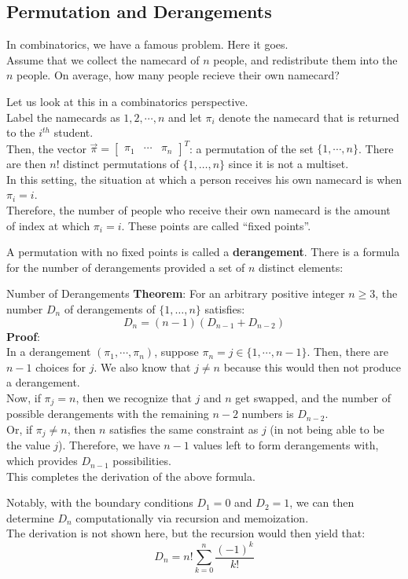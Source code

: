 \subsection{Permutation and Derangements}
In combinatorics, we have a famous problem. Here it goes. \\
Assume that we collect the namecard of $n$ people, and redistribute them into the $n$ people. On average, how many people recieve their own namecard?

Let us look at this in a combinatorics perspective. \\
Label the namecards as $1, 2, \cdots, n$ and let $\pi_i$ denote the namecard that is returned to the $i^{th}$ student. \\
Then, the vector $\vec{\pi} = \begin{bmatrix} \pi_1 & \cdots & \pi_n \end{bmatrix}^T$: a permutation of the set $\{1, \cdots, n\}$. There are then $n!$ distinct permutations of $\{1, \dots, n\}$ since it is not a multiset. \\
In this setting, the situation at which a person receives his own namecard is when $\pi_i = i$. \\
Therefore, the number of people who receive their own namecard is the amount of index at which $\pi_i = i$. These points are called ``fixed points''.

A permutation with no fixed points is called a \textbf{derangement}. There is a formula for the number of derangements provided a set of $n$ distinct elements:
\begin{ln-theorem}{Number of Derangements}{}
    \textbf{Theorem}: For an arbitrary positive integer $n \geq 3$, the number $D_n$ of derangements of $\{1, \dots, n\}$ satisfies:
    \[D_n = (n - 1)(D_{n - 1} + D_{n - 2})\]
    \tcblower
    \textbf{Proof}: \\
    In a derangement $(\pi_1, \cdots, \pi_n)$, suppose $\pi_n = j \in \{1, \cdots, n - 1\}$. Then, there are $n - 1$ choices for $j$. We also know that $j \neq n$ because this would then not produce a derangement. \\
    Now, if $\pi_j = n$, then we recognize that $j$ and $n$ get swapped, and the number of possible derangements with the remaining $n - 2$ numbers is $D_{n - 2}$. \\
    Or, if $\pi_j \neq n$, then $n$ satisfies the same constraint as $j$ (in not being able to be the value $j$). Therefore, we have $n - 1$ values left to form derangements with, which provides $D_{n - 1}$ possibilities. \\
    This completes the derivation of the above formula.
\end{ln-theorem}
Notably, with the boundary conditions $D_1 = 0$ and $D_2 = 1$, we can then determine $D_n$ computationally via recursion and memoization. \\
The derivation is not shown here, but the recursion would then yield that:
\[D_n = n! \sum_{k = 0}^n \frac{{(-1)}^k}{k!}\]

